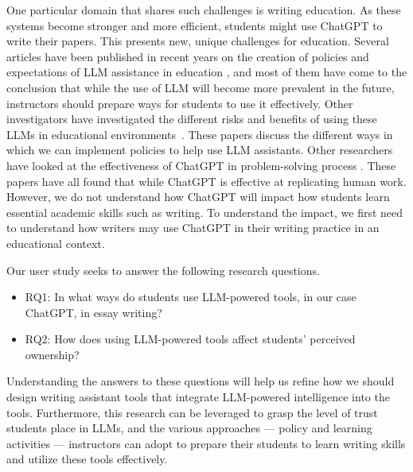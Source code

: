 \documentclass[sigconf]{acmart}
\begin{document}
One particular domain that shares such challenges is writing education. As these systems become stronger and more efficient, students might use ChatGPT to write their papers. This presents new, unique challenges for education. Several articles have been published in recent years on the creation of policies and expectations of LLM assistance in education \cite{adams_artificial_2022, cotton_chatting_2023, halaweh_chatgpt_2023, biswas_role_2023}, and most of them have come to the conclusion that while the use of LLM will become more prevalent in the future, instructors should prepare ways for students to use it effectively. Other investigators have investigated the different risks and benefits of using these LLMs in educational environments~\cite{anders_is_2023,sok_chatgpt_2023, joyner_chatgpt_2023, Warner_chatgpt_2023,mosaiyebzadeh_exploring_2023}. These papers discuss the different ways in which we can implement policies to help use LLM assistants. 
Other researchers have looked at the effectiveness of ChatGPT in problem-solving process \cite{shoufan_can_2023, rudolph_chatgpt_2023, ali_impact_2023, hilliger_assessing_2022}. These papers have all found that while ChatGPT is effective at replicating human work. 
However, we do not understand how ChatGPT will impact how students learn essential academic skills such as writing. To understand the impact, we first need to understand how writers may use ChatGPT in their writing practice in an educational context.  %


Our user study seeks to answer the following research questions. 
\begin{itemize}
    \item RQ1: In what ways do students use LLM-powered tools, in our case ChatGPT, in essay writing?
    \item RQ2: How does using LLM-powered tools affect students' perceived ownership?
\end{itemize}
Understanding the answers to these questions will help us refine how we should design writing assistant tools that integrate LLM-powered intelligence into the tools. Furthermore, this research can be leveraged to grasp the level of trust students place in LLMs, and the various approaches --- policy and learning activities --- instructors can adopt to prepare their students to learn writing skills and utilize these tools effectively.
\end{document}
